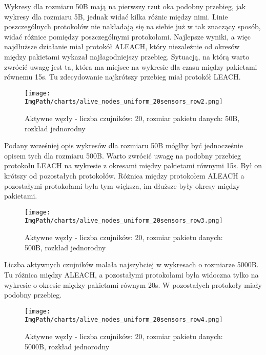 Wykresy dla rozmiaru 50B mają na pierwszy rzut oka podobny przebieg, jak wykresy dla rozmiaru 5B, jednak widać kilka różnic między nimi. Linie poszczególnych protokołów nie nakładają się na siebie już w tak znaczący sposób, widać różnice pomiędzy poszczególnymi protokołami. Najlepsze wyniki, a więc najdłuższe działanie miał protokół ALEACH, który niezależnie od okresów między pakietami wykazał najłagodniejszy przebieg. Sytuacją, na którą warto zwrócić uwagę jest ta, która ma miejsce na wykresie dla czasu między pakietami równemu 15s. Tu zdecydowanie najkrótszy przebieg miał protokół LEACH.

\begin{figure}[H]
	\begin{center}
		\texttt{[image: \\ImgPath/charts/alive\_nodes\_uniform\_20sensors\_row2.png]}
	\end{center}
	\caption{Aktywne węzły - liczba czujników: 20, rozmiar pakietu danych: 50B, rozkład jednorodny}
\end{figure}

 Podany wcześniej opis wykresów dla rozmiaru 50B mógłby być jednocześnie opisem tych dla rozmiaru 500B. Warto zwrócić uwagę na podobny przebieg protokołu LEACH na wykresie z okresami między pakietami równymi 15s. Był on krótszy od pozostałych protokołów. Różnica między protokołem ALEACH a pozostałymi protokołami była tym większa, im dłuższe były okresy między pakietami.

\begin{figure}[H]
	\begin{center}
		\texttt{[image: \\ImgPath/charts/alive\_nodes\_uniform\_20sensors\_row3.png]}
	\end{center}
	\caption{Aktywne węzły - liczba czujników: 20, rozmiar pakietu danych: 500B, rozkład jednorodny}
\end{figure} 
  
Liczba aktywnych czujników malała najszybciej w wykresach o rozmiarze 5000B. Tu różnica między ALEACH, a pozostałymi protokołami była widoczna tylko na wykresie o okresie między pakietami równym 20s. W pozostałych protokoły miały podobny przebieg. 

\begin{figure}[H]
	\begin{center}
		\texttt{[image: \\ImgPath/charts/alive\_nodes\_uniform\_20sensors\_row4.png]}
	\end{center}
	\caption{Aktywne węzły - liczba czujników: 20, rozmiar pakietu danych: 5000B, rozkład jednorodny}
\end{figure}


